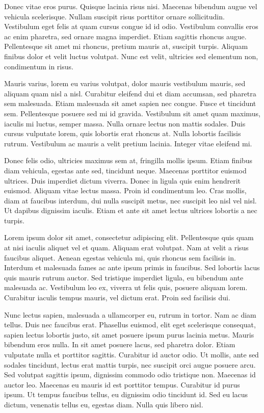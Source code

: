 \documentclass{./styles/UoYCSproject}
\begin{document}
\begin{summary}
Donec vitae eros purus. Quisque lacinia risus nisi. Maecenas bibendum augue vel vehicula scelerisque. Nullam suscipit risus porttitor ornare sollicitudin. Vestibulum eget felis at quam cursus congue id id odio. Vestibulum convallis eros ac enim pharetra, sed ornare magna imperdiet. Etiam sagittis rhoncus augue. Pellentesque sit amet mi rhoncus, pretium mauris at, suscipit turpis. Aliquam finibus dolor et velit luctus volutpat. Nunc est velit, ultricies sed elementum non, condimentum in risus.

Mauris varius, lorem eu varius volutpat, dolor mauris vestibulum mauris, sed aliquam quam nisl a nisl. Curabitur eleifend dui et diam accumsan, sed pharetra sem malesuada. Etiam malesuada sit amet sapien nec congue. Fusce et tincidunt sem. Pellentesque posuere sed mi id gravida. Vestibulum sit amet quam maximus, iaculis mi luctus, semper massa. Nulla ornare lectus non mattis sodales. Duis cursus vulputate lorem, quis lobortis erat rhoncus at. Nulla lobortis facilisis rutrum. Vestibulum ac mauris a velit pretium lacinia. Integer vitae eleifend mi.

Donec felis odio, ultricies maximus sem at, fringilla mollis ipsum. Etiam finibus diam vehicula, egestas ante sed, tincidunt neque. Maecenas porttitor euismod ultrices. Duis imperdiet dictum viverra. Donec in ligula quis enim hendrerit euismod. Aliquam vitae lectus massa. Proin id condimentum leo. Cras mollis, diam at faucibus interdum, dui nulla suscipit metus, nec suscipit leo nisl vel nisl. Ut dapibus dignissim iaculis. Etiam et ante sit amet lectus ultrices lobortis a nec turpis.

Lorem ipsum dolor sit amet, consectetur adipiscing elit. Pellentesque quis quam at nisi iaculis aliquet vel et quam. Aliquam erat volutpat. Nam at velit a risus faucibus aliquet. Aenean egestas vehicula mi, quis rhoncus sem facilisis in. Interdum et malesuada fames ac ante ipsum primis in faucibus. Sed lobortis lacus quis mauris rutrum auctor. Sed tristique imperdiet ligula, eu bibendum ante malesuada ac. Vestibulum leo ex, viverra ut felis quis, posuere aliquam lorem. Curabitur iaculis tempus mauris, vel dictum erat. Proin sed facilisis dui.

Nunc lectus sapien, malesuada a ullamcorper eu, rutrum in tortor. Nam ac diam tellus. Duis nec faucibus erat. Phasellus euismod, elit eget scelerisque consequat, sapien lectus lobortis justo, sit amet posuere ipsum purus lacinia metus. Mauris bibendum eros nulla. In sit amet posuere lacus, sed pharetra dolor. Etiam vulputate nulla et porttitor sagittis. Curabitur id auctor odio. Ut mollis, ante sed sodales tincidunt, lectus erat mattis turpis, nec suscipit orci augue posuere arcu. Sed volutpat sagittis ipsum, dignissim commodo odio tristique non. Maecenas id auctor leo. Maecenas eu mauris id est porttitor tempus. Curabitur id purus ipsum. Ut tempus faucibus tellus, eu dignissim odio tincidunt id. Sed eu lacus dictum, venenatis tellus eu, egestas diam. Nulla quis libero nisl.
\end{summary}
\end{document}
